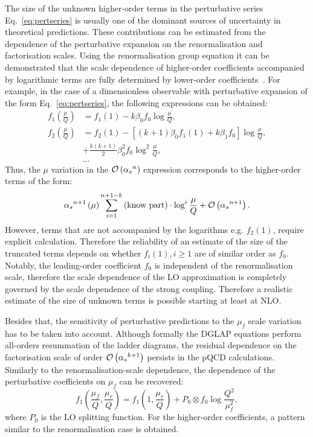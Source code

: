 The size of the unknown higher-order terms in the perturbative series Eq.~\eqref{eq:pertseries} is usually one of the dominant sources of uncertainty in theoretical predictions. These contributions can be estimated from the dependence of the perturbative expansion on the renormalisation and factorisation scales. Using the renormalisation group equation it can be demonstrated that the scale dependence of higher-order coefficients accompanied by logarithmic terms are fully determined by lower-order coefficients~\cite{Behnke:2013pga}. For example, in the case of a dimensionless observable with perturbative expansion of the form Eq.~\eqref{eq:pertseries}, the following expressions can be obtained:
\begin{align}
	f_1\left(\frac{\mu}{Q}\right) &= f_1\left(1\right) - k\beta_0f_0\log{\frac{\mu}{Q}}, \\
	f_2\left(\frac{\mu}{Q}\right) &= f_2\left(1\right) - \left[\left(k+1\right)\beta_0f_1\left(1\right) + k\beta_1f_0\right]\log{\frac{\mu}{Q}}, \\
																						&+ \frac{k\left(k+1\right)}{2}\beta_0^2f_0\log^2{\frac{\mu}{Q}},\\
																						& \ldots 
\end{align}
Thus, the $\mu$ variation in the $\mathcal{O}\left(\mbox{$\alpha_{s}$}^n\right)$ expression corresponds to the higher-order terms of the form:
\begin{equation}
 \mbox{$\alpha_{s}$}^{n+1}\left(\mu\right) \sum_{i=1}^{n+1-k}{\text{(know part)}\cdot\log^i{\frac{\mu}{Q}}} + \mathcal{O}\left(\mbox{$\alpha_{s}$}^{n+1}\right).
\label{eq:scalevariationerror}
\end{equation}
However, terms that are not accompanied by the logarithms e.g. $f_2\left(1\right)$, require explicit calculation. Therefore the reliability of an estimate of the size of the truncated terms depends on whether $f_i\left(1\right), i \ge 1$ are of similar order as $f_0$. Notably,
the leading-order coefficient $f_0$ is independent of the renormalisation scale, therefore the scale dependence of the LO approximation is completely governed by the scale dependence of the strong coupling. Therefore a realistic estimate of the size of unknown terms is possible starting at least at NLO.

Besides that, the sensitivity of perturbative predictions to the $\mu_f$ scale variation has to be taken into account. Although formally the DGLAP equations perform all-orders resummation of the ladder diagrams, the residual dependence on the factorisation scale of order $\mathcal{O}\left(\mbox{$\alpha_{s}$}^{k+1}\right)$ persists in the pQCD calculations. Similarly to the renormalisation-scale dependence, the dependence of the perturbative coefficients on $\mu_f$ can be recovered:
\begin{equation}
 f_1\left(\frac{\mu_f}{Q},\frac{\mu_r}{Q}\right) = f_1\left(1,\frac{\mu_r}{Q}\right) + P_0 \otimes f_0 \log{\frac{Q^2}{\mu_f^2}},
\label{eq:factorisationscaledep}
\end{equation}
where $P_0$ is the LO splitting function. For the higher-order coefficients, a pattern similar to the renormalisation case is obtained.

